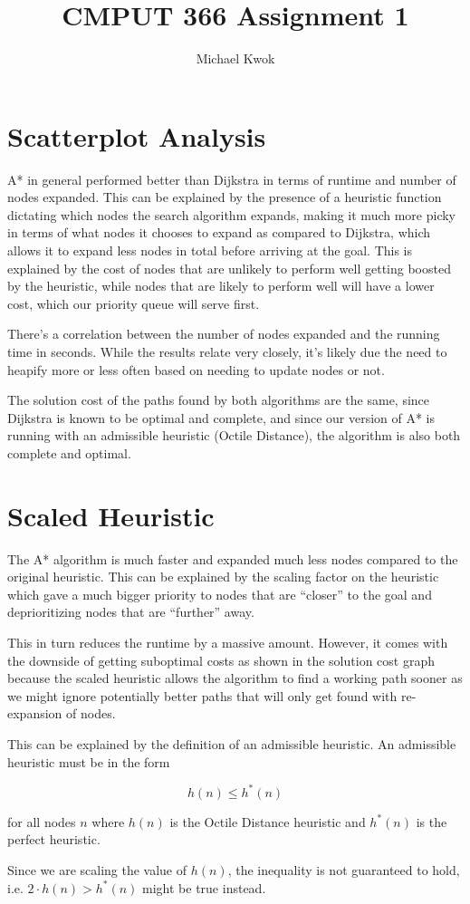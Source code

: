 \documentclass{article}
\title{CMPUT 366 Assignment 1}
\author{Michael Kwok}
\begin{document}
\maketitle
\section*{Scatterplot Analysis}

\begin{figure}

\end{figure}

A* in general performed better than Dijkstra in terms of runtime and number of nodes expanded. This can be explained by the presence of a heuristic function dictating which nodes the search algorithm expands, making it much more picky in terms of what nodes it chooses to expand as compared to Dijkstra, which allows it to expand less nodes in total before arriving at the goal. This is explained by the cost of nodes that are unlikely to perform well getting boosted by the heuristic, while nodes that are likely to perform well will have a lower cost, which our priority queue will serve first.

There's a correlation between the number of nodes expanded and the running time in seconds. While the results relate very closely, it's likely due the need to heapify more or less often based on needing to update nodes or not.

The solution cost of the paths found by both algorithms are the same, since Dijkstra is known to be optimal and complete, and since our version of A* is running with an admissible heuristic (Octile Distance), the algorithm is also both complete and optimal.


\section*{Scaled Heuristic}

The A* algorithm is much faster and expanded much less nodes compared to the original heuristic. This can be explained by the scaling factor on the heuristic which gave a much bigger priority to nodes that are ``closer'' to the goal and deprioritizing nodes that are ``further'' away.

This in turn reduces the runtime by a massive amount. However, it comes with the downside of getting suboptimal costs as shown in the solution cost graph because the scaled heuristic allows the algorithm to find a working path sooner as we might ignore potentially better paths that will only get found with re-expansion of nodes.

This can be explained by the definition of an admissible heuristic. An admissible heuristic must be in the form

\[
    h\left(n\right) \leq h^{*}\left(n\right)
\]

for all nodes \( n \) where \( h\left(n\right) \) is the Octile Distance heuristic and \( h^{*}\left(n\right) \) is the perfect heuristic.

Since we are scaling the value of \(h\left(n\right)\), the inequality is not guaranteed to hold, i.e. \( 2 \cdot h\left(n\right) > h^{*}\left(n\right)\) might be true instead.
\end{document}
